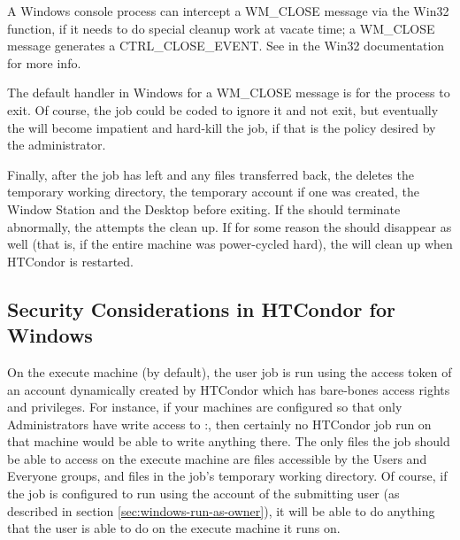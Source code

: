 \Note A Windows console process can intercept a WM\_CLOSE message
via the Win32  function,
if it needs to do special cleanup work at vacate time; 
a WM\_CLOSE message generates a CTRL\_CLOSE\_EVENT.
See  in the Win32
documentation for more info.

\Note The default handler in Windows for a WM\_CLOSE message is for the
process to exit.  Of course, the job could be coded to ignore it and not
exit, but eventually the  will become impatient and hard-kill
the job, if that is the policy desired by the administrator.

Finally, after the job has left and any files transferred back, 
the  deletes the temporary working directory, 
the temporary account if one was created,
the Window Station and the Desktop before exiting. 
If the  should terminate abnormally, 
the  attempts the clean up.  
If for some reason the  should disappear as well
(that is, if the entire machine was power-cycled hard),
the  will clean up when HTCondor is restarted.

\subsection{Security Considerations in HTCondor for Windows}


On the execute machine (by default), the user job is run using the
access token of an account dynamically created by HTCondor which has
bare-bones access rights and privileges.  For instance, if your
machines are configured so that only Administrators have write access
to
\verb@C:\WINNT@, then certainly no HTCondor job run on that machine
would be able to write anything there.  The only files the job should
be able to access on the execute machine are files accessible by the
Users and Everyone groups, and files in the job's temporary working
directory.  Of course, if the job is configured to run using the
account of the submitting user (as described in section
\ref{sec:windows-run-as-owner}), it will be able to do anything that
the user is able to do on the execute machine it runs on.

